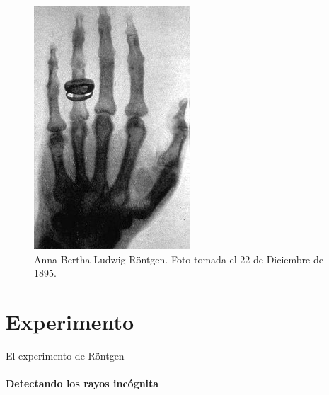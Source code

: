 \documentclass{beamer}
\begin{document}
\begin{darkframes}
\begin{frame}
\begin{multicols}{2}
     \newpage
     \begin{figure}
         \centering
         \includegraphics[width = 0.85 \linewidth]{resources/4f.jpg}
         \caption{Anna Bertha Ludwig Röntgen. Foto tomada el 22 de Diciembre de 1895.}
         \label{fig:my_label}
     \end{figure}
  
      \end{multicols}
    \end{frame}

    \section{Experimento} %
    \begin{frame}{El experimento de Röntgen} %
      \framesubtitle{Detectando los rayos inc\'ognita} %
     

\end{frame}
\end{darkframes}
\end{document}
